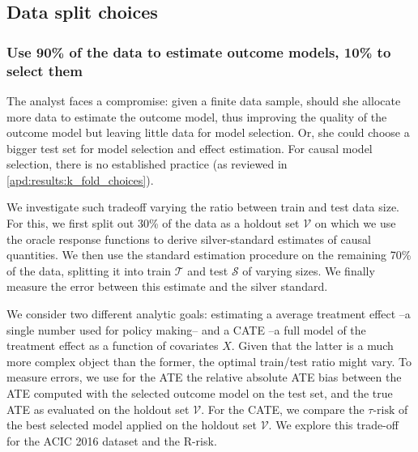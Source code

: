 \documentclass[a4paper,num-refs]{oup-contemporary}%
\begin{document}
\FloatBarrier

\subsection{Data split choices}\label{apd:results:data_split}

\subsubsection{Use 90\% of the data to estimate outcome models, 10\% to
    select them}

The analyst faces a compromise: given a finite
data sample, should she allocate more data to estimate the outcome model,
thus improving the quality of the outcome model but leaving
little data for model selection. Or, she could choose a bigger test set for
model selection and effect estimation. For causal model selection, there
is no established practice (as reviewed in \ref{apd:results:k_fold_choices}).

We investigate such tradeoff varying the ratio between train and test
data size. For this, we first split out 30\% of the data as a holdout set
$\mathcal{V}$ on which we use the oracle response functions to derive
silver-standard estimates of causal quantities. We then
use the standard estimation procedure on the remaining 70\% of the data,
splitting it into train $\mathcal{T}$ and test $\mathcal{S}$ of varying
sizes. We finally measure the error between this estimate and the
silver standard.

We consider two different analytic goals: estimating a average
treatment effect --a single number used for policy making-- and a
CATE --a full model of the treatment effect as a function of covariates
$X$. Given that the latter is a much more complex object than the former,
the optimal train/test ratio might vary. To measure errors, we use for
the ATE the relative absolute ATE bias between the ATE computed with the
selected outcome model on the test set, and the true ATE as evaluated on
the holdout set $\mathcal{V}$. For the CATE, we compare the
$\tau\text{-risk}$
of the best selected model applied on the holdout set $\mathcal{V}$. We explore this trade-off for the ACIC 2016 dataset and the R-risk.
\end{document}
